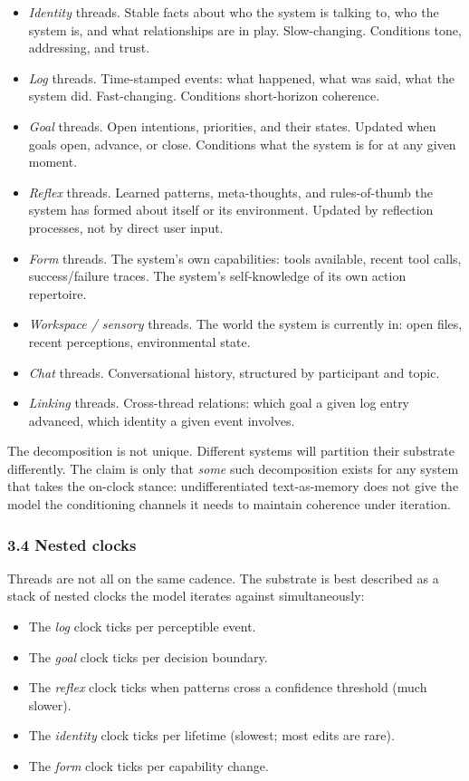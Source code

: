 \documentclass[11pt,letterpaper]{article}
\begin{document}
\begin{itemize}
  \item \emph{Identity} threads. Stable facts about who the system is talking to, who the system is, and what relationships are in play. Slow-changing. Conditions tone, addressing, and trust.
  \item \emph{Log} threads. Time-stamped events: what happened, what was said, what the system did. Fast-changing. Conditions short-horizon coherence.
  \item \emph{Goal} threads. Open intentions, priorities, and their states. Updated when goals open, advance, or close. Conditions what the system is for at any given moment.
  \item \emph{Reflex} threads. Learned patterns, meta-thoughts, and rules-of-thumb the system has formed about itself or its environment. Updated by reflection processes, not by direct user input.
  \item \emph{Form} threads. The system's own capabilities: tools available, recent tool calls, success/failure traces. The system's self-knowledge of its own action repertoire.
  \item \emph{Workspace / sensory} threads. The world the system is currently in: open files, recent perceptions, environmental state.
  \item \emph{Chat} threads. Conversational history, structured by participant and topic.
  \item \emph{Linking} threads. Cross-thread relations: which goal a given log entry advanced, which identity a given event involves.
\end{itemize}

The decomposition is not unique. Different systems will partition their substrate differently. The claim is only that \emph{some} such decomposition exists for any system that takes the on-clock stance: undifferentiated text-as-memory does not give the model the conditioning channels it needs to maintain coherence under iteration.

\subsubsection*{3.4 Nested clocks}

Threads are not all on the same cadence. The substrate is best described as a stack of nested clocks the model iterates against simultaneously:

\begin{itemize}
  \item The \emph{log} clock ticks per perceptible event.
  \item The \emph{goal} clock ticks per decision boundary.
  \item The \emph{reflex} clock ticks when patterns cross a confidence threshold (much slower).
  \item The \emph{identity} clock ticks per lifetime (slowest; most edits are rare).
  \item The \emph{form} clock ticks per capability change.
\end{itemize}
\end{document}
